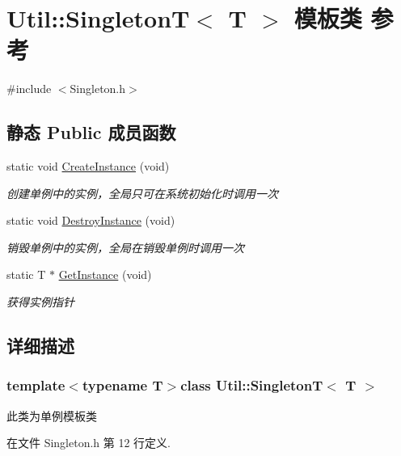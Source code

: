 \hypertarget{class_util_1_1_singleton_t}{\section{Util\-:\-:Singleton\-T$<$ T $>$ 模板类 参考}
\label{class_util_1_1_singleton_t}
}


{\ttfamily \#include $<$Singleton.\-h$>$}

\subsection*{静态 Public 成员函数}
\begin{DoxyCompactItemize}
\item 
static void \hyperlink{class_util_1_1_singleton_t_adc93fbaad3654ccfcbc568af60f79b83}{Create\-Instance} (void)
\begin{DoxyCompactList}\small\item\em 创建单例中的实例，全局只可在系统初始化时调用一次 \end{DoxyCompactList}\item 
static void \hyperlink{class_util_1_1_singleton_t_a57e01e60edc894293383bb1b6375e2a2}{Destroy\-Instance} (void)
\begin{DoxyCompactList}\small\item\em 销毁单例中的实例，全局在销毁单例时调用一次 \end{DoxyCompactList}\item 
static T $\ast$ \hyperlink{class_util_1_1_singleton_t_a977b19d9052e8d16cd5ed79d7d49d597}{Get\-Instance} (void)
\begin{DoxyCompactList}\small\item\em 获得实例指针 \end{DoxyCompactList}\end{DoxyCompactItemize}


\subsection{详细描述}
\subsubsection*{template$<$typename T$>$class Util\-::\-Singleton\-T$<$ T $>$}

此类为单例模板类 

在文件 Singleton.\-h 第 12 行定义.



